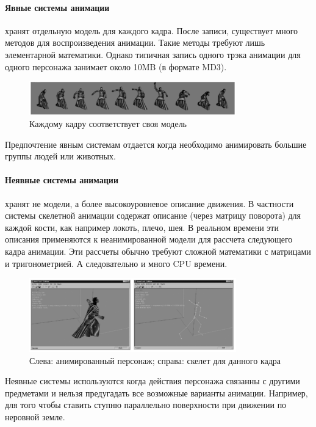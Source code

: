 \paragraph{Явные системы анимации} хранят отдельную модель для каждого кадра.
После записи, существует много методов для воспроизведения анимации.
Такие методы требуют лишь элементарной математики.
Однако типичная запись одного трэка анимации для одного персонажа занимает около 10MB (в формате MD3).

\begin{figure}[h!]
    \centering
    \includegraphics[width=0.8\textwidth]{explicit_animation.png}
    \caption{Каждому кадру соответствует своя модель}
\end{figure}

Предпочтение явным системам отдается когда необходимо анимировать большие группы людей или животных.

\paragraph{Неявные системы анимации} хранят не модели, а более высокоуровневое описание движения.
В частности системы скелетной анимации содержат описание (через матрицу поворота) для каждой кости, как например локоть, плечо, шея.
В реальном времени эти описания применяются к неанимированной модели для рассчета следующего кадра анимации.
Эти рассчеты обычно требуют сложной математики с матрицами и тригонометрией.
А следовательно и много CPU времени.


\begin{figure}[h!]
    \centering
    \includegraphics[width=0.8\textwidth]{implicit_animation.png}
    \caption{\scriptsize{Слева: анимированный персонаж; справа: скелет для данного кадра}}
\end{figure}

Неявные системы используются когда действия персонажа связанны с другими предметами и нельзя предугадать все возможные варианты анимации. Например, для того чтобы ставить ступню параллельно поверхности при движении по неровной земле.


